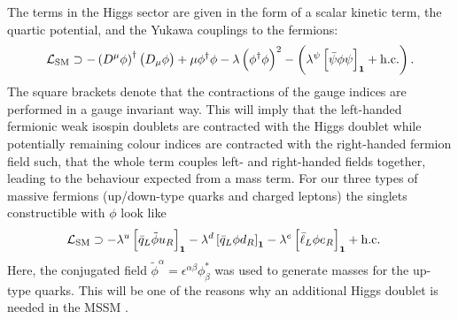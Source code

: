\noindent The terms in the Higgs sector are given in the form of a scalar kinetic term, the quartic potential, and the Yukawa couplings to the fermions:
\begin{align}
  \mathcal{L}_\text{SM}\supset-\left(D^\mu\phi\right)^\dagger\left(D_\mu\phi\right)+\mu\phi^\dagger\phi-\lambda\left(\phi^\dagger\phi\right)^2-\left(\lambda^\psi\left[\bar{\psi}\phi\psi\right]_{\mathbf{1}}+\mathrm{h. c.}\right).
\end{align}
The square brackets denote that the contractions of the gauge indices are performed in a gauge invariant way. This will imply that the left-handed fermionic weak isospin doublets are contracted with the Higgs doublet while potentially remaining colour indices are contracted with the right-handed fermion field such, that the whole term couples left- and right-handed fields together, leading to the behaviour expected from a mass term.
For our three types of massive fermions (up/down-type quarks and charged leptons) the singlets constructible with $\phi$ look like
\begin{align}
\mathcal{L}_\text{SM}&\supset-\lambda^u\left[\bar{q}_L\tilde{\phi}u_R\right]_{\mathbf{1}}-\lambda^d\left[\bar{q}_L\phi d_R\right]_{\mathbf{1}}-\lambda^e\left[\bar{\ell}_L\phi e_R\right]_{\mathbf{1}}+\mathrm{h. c.}
\end{align}
Here, the conjugated field $\tilde{\phi}^\alpha=\epsilon^{\alpha\beta}\phi^*_\beta$ was used to generate masses for the up-type quarks. This will be one of the reasons why an additional Higgs doublet is needed in the MSSM \cite{arthur, pdg, peskin, higgs}.

